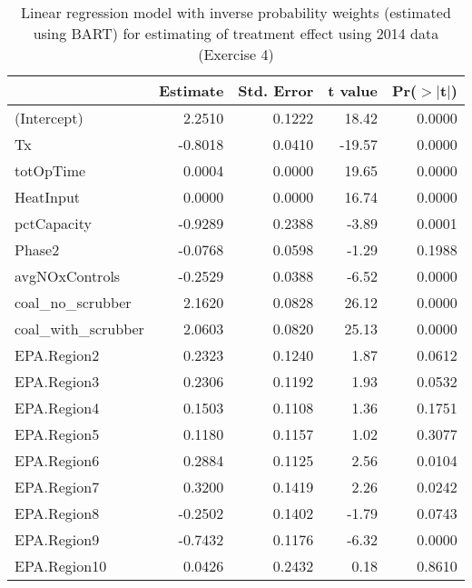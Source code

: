 \begin{table}[ht]
\centering
\begin{tabular}{lrrrr}
  \toprule
 & Estimate & Std. Error & t value & Pr($>$$|$t$|$) \\ 
  \midrule
(Intercept) & 2.2510 & 0.1222 & 18.42 & 0.0000 \\ 
  Tx & -0.8018 & 0.0410 & -19.57 & 0.0000 \\ 
  totOpTime & 0.0004 & 0.0000 & 19.65 & 0.0000 \\ 
  HeatInput & 0.0000 & 0.0000 & 16.74 & 0.0000 \\ 
  pctCapacity & -0.9289 & 0.2388 & -3.89 & 0.0001 \\ 
  Phase2 & -0.0768 & 0.0598 & -1.29 & 0.1988 \\ 
  avgNOxControls & -0.2529 & 0.0388 & -6.52 & 0.0000 \\ 
  coal\_no\_scrubber & 2.1620 & 0.0828 & 26.12 & 0.0000 \\ 
  coal\_with\_scrubber & 2.0603 & 0.0820 & 25.13 & 0.0000 \\ 
  EPA.Region2 & 0.2323 & 0.1240 & 1.87 & 0.0612 \\ 
  EPA.Region3 & 0.2306 & 0.1192 & 1.93 & 0.0532 \\ 
  EPA.Region4 & 0.1503 & 0.1108 & 1.36 & 0.1751 \\ 
  EPA.Region5 & 0.1180 & 0.1157 & 1.02 & 0.3077 \\ 
  EPA.Region6 & 0.2884 & 0.1125 & 2.56 & 0.0104 \\ 
  EPA.Region7 & 0.3200 & 0.1419 & 2.26 & 0.0242 \\ 
  EPA.Region8 & -0.2502 & 0.1402 & -1.79 & 0.0743 \\ 
  EPA.Region9 & -0.7432 & 0.1176 & -6.32 & 0.0000 \\ 
  EPA.Region10 & 0.0426 & 0.2432 & 0.18 & 0.8610 \\ 
   \bottomrule
\end{tabular}
\caption{Linear regression model with inverse probability weights
  (estimated using BART) for estimating of treatment effect using 2014
  data (Exercise 4)}
\label{tab:lm-2g-14}
\end{table}

